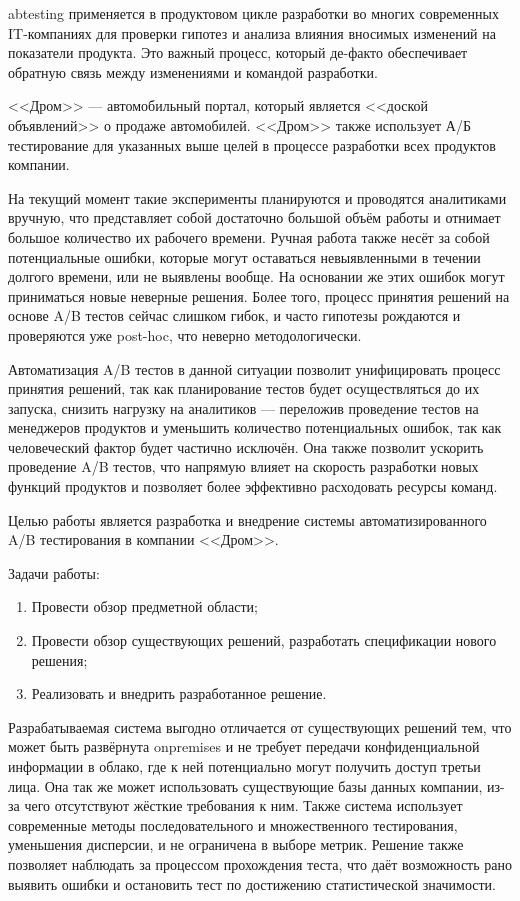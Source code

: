 \documentclass[../document.tex]{subfiles}
\begin{document}
	\par\gls{abtesting} применяется в продуктовом цикле разработки во многих современных IT-компаниях для проверки гипотез и анализа влияния вносимых изменений на показатели продукта. Это важный процесс, который де-факто обеспечивает обратную связь между изменениями и командой разработки.
	\par <<Дром>> --- автомобильный портал, который является <<доской объявлений>> о продаже автомобилей. <<Дром>> также использует А/Б тестирование для указанных выше целей в процессе разработки всех продуктов компании.
	\par На текущий момент такие эксперименты планируются и проводятся аналитиками вручную, что представляет собой достаточно большой объём работы и отнимает большое количество их рабочего времени. Ручная работа также несёт за собой потенциальные ошибки, которые могут оставаться невыявленными в течении долгого времени, или не выявлены вообще. На основании же этих ошибок могут приниматься новые неверные решения. Более того, процесс принятия решений на основе A/B тестов сейчас слишком гибок, и часто гипотезы рождаются и проверяются уже post-hoc, что неверно методологически.
	\par Автоматизация A/B тестов в данной ситуации позволит унифицировать процесс принятия решений, так как планирование тестов будет осуществляться до их запуска, снизить нагрузку на аналитиков --- переложив проведение тестов на менеджеров продуктов и уменьшить количество потенциальных ошибок, так как человеческий фактор будет частично исключён. Она также позволит ускорить проведение A/B тестов, что напрямую влияет на скорость разработки новых функций продуктов и позволяет более эффективно расходовать ресурсы команд.
	\par Целью работы является разработка и внедрение системы автоматизированного A/B тестирования в компании <<Дром>>.
	\par Задачи работы:
	\begin{enumerate}
		\item Провести обзор предметной области;
		\item Провести обзор существующих решений, разработать спецификации нового решения;
		\item Реализовать и внедрить разработанное решение.
	\end{enumerate}
	\par Разрабатываемая система выгодно отличается от существующих решений тем, что может быть развёрнута \gls{onpremises} и не требует передачи конфиденциальной информации в облако, где к ней потенциально могут получить доступ третьи лица. Она так же может использовать существующие базы данных компании, из-за чего отсутствуют жёсткие требования к ним. Также система использует современные методы последовательного и множественного тестирования, уменьшения дисперсии, и не ограничена в выборе метрик. Решение также позволяет наблюдать за процессом прохождения теста, что даёт возможность рано выявить ошибки и остановить тест по достижению статистической значимости.
\end{document}
